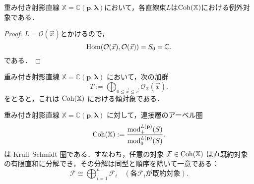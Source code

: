 \begin{lemm}
	重み付き射影直線 $\mathbb{X} = \mathbb{C}(\mathbf{p}, \boldsymbol{\lambda})$において，各直線束$L$は$\operatorname{\mathrm{Coh}}({\mathbb X})$における例外対象である．
\end{lemm}
\begin{proof}
	$L = \mathcal{O}(\vec{x})$とかけるので，
	\[\operatorname{\mathrm{Hom}}(\mathcal{O}(\vec{x}),\mathcal{O}(\vec{x}))=S_0={\mathbb C}.\]
	である．
\end{proof}

\begin{thm}\cite{GL87}
重み付き射影直線 $\mathbb{X} = \mathbb{C}(\mathbf{p}, \boldsymbol{\lambda})$ において，次の加群
\[
T := \bigoplus_{0 \le \vec{x} \le \vec{c}} \mathcal{O}_{\mathbb{X}}(\vec{x}).
\]
をとると，これは $\operatorname{\mathrm{Coh}}(\mathbb{X})$ における傾対象である．
\end{thm}


\begin{thm}\cite{GL87}
重み付き射影直線 $\mathbb{X} = \mathbb{C}(\mathbf{p}, \boldsymbol{\lambda})$ に対して，連接層のアーベル圏
\[
\operatorname{\mathrm{Coh}}(\mathbb{X}) := \frac{\mathrm{mod}_+^{L(\mathbf{p})}(S)}{\mathrm{mod}_0^{L(\mathbf{p})}(S)}.
\]
は Krull--Schmidt 圏である．すなわち，任意の対象 $\mathcal{F} \in \operatorname{\mathrm{Coh}}(\mathbb{X})$ は直既約対象の有限直和に分解でき，その分解は同型と順序を除いて一意である：
\[
\mathcal{F} \cong \bigoplus_{i=1}^n \mathcal{F}_i \quad (\text{各} \mathcal{F}_i \text{が既約対象}).
\]
\end{thm}


